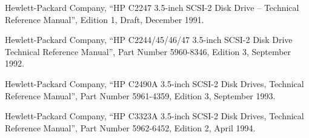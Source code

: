 \begin{thebibliography}{99}




Hewlett-Packard Company,
``HP C2247 3.5-inch SCSI-2 Disk Drive -- Technical Reference Manual'',
Edition 1, Draft, December 1991.

Hewlett-Packard Company,
``HP C2244/45/46/47 3.5-inch SCSI-2 Disk Drive Technical Reference Manual'',
Part Number 5960-8346, Edition 3, September 1992.

Hewlett-Packard Company,
``HP C2490A 3.5-inch SCSI-2 Disk Drives, Technical Reference Manual'',
Part Number 5961-4359, Edition 3, September 1993.

Hewlett-Packard Company,
``HP C3323A 3.5-inch SCSI-2 Disk Drives, Technical Reference Manual'',
Part Number 5962-6452, Edition 2, April 1994.






\end{thebibliography}
